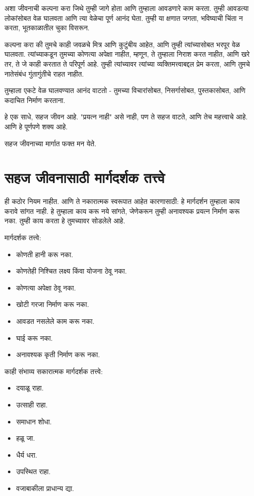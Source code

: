 अशा जीवनाची कल्पना करा जिथे तुम्ही जागे होता आणि तुम्हाला आवडणारे काम करता. तुम्ही आवडत्या लोकांसोबत वेळ घालवता आणि त्या वेळेचा पूर्ण आनंद घेता. तुम्ही या क्षणात जगता, भविष्याची चिंता न करता, भूतकाळातील चुका विसरून.

कल्पना करा की तुमचे काही जवळचे मित्र आणि कुटुंबीय आहेत, आणि तुम्ही त्यांच्यासोबत भरपूर वेळ घालवता. त्यांच्याकडून तुमच्या कोणत्या अपेक्षा नाहीत, म्हणून, ते तुम्हाला निराश करत नाहीत, आणि खरे तर, ते जे काही करतात ते परिपूर्ण आहे. तुम्ही त्यांच्यावर त्यांच्या व्यक्तिमत्त्वाबद्दल प्रेम करता, आणि तुमचे नातेसंबंध गुंतागुंतीचे राहत नाहीत.

तुम्हाला एकटे वेळ घालवण्यात आनंद वाटतो - तुमच्या विचारांसोबत, निसर्गासोबत, पुस्तकासोबत, आणि कदाचित निर्माण करताना.

हे एक साधे, सहज जीवन आहे. "प्रयत्न नाही" असे नाही, पण ते सहज वाटते, आणि तेच महत्त्वाचे आहे. आणि हे पूर्णपणे शक्य आहे.

सहज जीवनाच्या मार्गात फक्त मन येते.

\chapter{सहज जीवनासाठी मार्गदर्शक तत्त्वे}

ही कठोर नियम नाहीत. आणि ते नकारात्मक स्वरूपात आहेत कारणासाठी: हे मार्गदर्शन तुम्हाला काय करावे सांगत नाही. हे तुम्हाला काय करू नये सांगते, जेणेकरून तुम्ही अनावश्यक प्रयत्न निर्माण करू नका. तुम्ही काय करता हे तुमच्यावर सोडलेले आहे.

मार्गदर्शक तत्त्वे:
\begin{itemize}
\item कोणती हानी करू नका.
\item कोणतेही निश्चित लक्ष्य किंवा योजना ठेवू नका.
\item कोणत्या अपेक्षा ठेवू नका.
\item खोटी गरजा निर्माण करू नका.
\item आवडत नसलेले काम करू नका.
\item घाई करू नका.
\item अनावश्यक कृती निर्माण करू नका.
\end{itemize}

काही संभाव्य सकारात्मक मार्गदर्शक तत्त्वे:
\begin{itemize}
\item दयाळू राहा.
\item उत्साही राहा.
\item समाधान शोधा.
\item हळू जा.
\item धैर्य धरा.
\item उपस्थित राहा.
\item वजाबाकीला प्राधान्य द्या.
\end{itemize}

